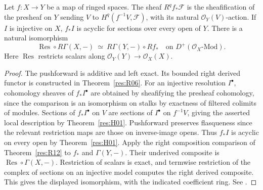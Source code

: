 \begin{theorem}
\label{res:H06}
Let \(f:X\to Y\) be a map of ringed spaces. The sheaf \(R^q f_*\mathcal F\)
is the sheafification of the presheaf on \(Y\) sending \(V\) to
\(H^q(f^{-1}V,\mathcal F)\), with its natural \(\mathcal O_Y(V)\)-action.
If \(I\) is injective on \(X\), \(f_*I\) is acyclic for sections over
every open of \(Y\). There is a natural isomorphism
\[
  \operatorname{Res}\circ R\Gamma(X,-)
     \ \simeq\ R\Gamma(Y,-)\circ Rf_*
   \quad\text{on }D^+(\mathcal O_X\text{-}\mathrm{Mod}).
\]
Here \(\operatorname{Res}\) restricts scalars along
\(\mathcal O_Y(Y)\to\mathcal O_X(X)\).
\end{theorem}
\begin{proof}
The pushforward is additive and left exact. Its bounded right derived
functor is constructed in Theorem~\ref{res:R06}. For an injective
resolution \(I^\bullet\), cohomology sheaves of \(f_*I^\bullet\)
are obtained by sheafifying the presheaf cohomology, since the
comparison is an isomorphism on stalks by exactness of filtered
colimits of modules. Sections of \(f_*I^\bullet\) on \(V\) are sections
of \(I^\bullet\) on \(f^{-1}V\), giving the asserted local description
by Theorem~\ref{res:H01}. Pushforward preserves flasqueness since
the relevant restriction maps are those on inverse-image opens.
Thus \(f_*I\) is acyclic on every open by Theorem~\ref{res:H01}.
Apply the right composition comparison of Theorem~\ref{res:R12}
to \(f_*\) and \(\Gamma(Y,-)\). Their underived composite is
\(\operatorname{Res}\circ\Gamma(X,-)\). Restriction of scalars is
exact, and termwise restriction of the complex of sections on
an injective model computes the right derived composite.
This gives the displayed isomorphism, with the indicated coefficient
ring. See \cite[Tags 0713, 01E4, 01EX, 01EZ]{stacks-sheaf}.
\end{proof}

